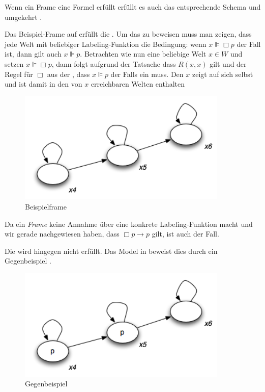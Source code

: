 Wenn ein Frame eine Formel erfüllt erfüllt es auch das entsprechende Schema und umgekehrt .

\begin{example}
	Das Beispiel-Frame auf  erfüllt die \TFormel.
	Um das zu beweisen muss man zeigen, dass jede Welt mit beliebiger Labeling-Funktion die Bedingung: wenn $x \VDash \Box p$ der Fall ist, dann gilt auch $x \VDash p$.
	Betrachten wie nun eine beliebige Welt $x \in W$ und setzen $x \VDash \Box p$, dann folgt aufgrund der Tatsache dass $R(x,x)$ gilt und der Regel für $\Box$ aus der , dass $x \VDash p$ der Falls ein muss.
	Den $x$ zeigt auf sich selbst und ist damit in den von $x$ erreichbaren Welten enthalten

	\begin{figure}[h!]
		\label{fig:Kripke02}
		\centering
		\includegraphics[width=10cm]{Images/Kripke02}
		\caption{Beispielframe}
	\end{figure}

	Da ein \emph{Frame} keine Annahme über eine konkrete Labeling-Funktion macht und wir gerade nachgewiesen haben, dass $\Box p \rightarrow p$ gilt, ist auch \TFormel der Fall.
	
	Die \vierFormel wird hingegen nicht erfüllt.
	Das Model in  beweist dies durch ein Gegenbeispiel
	.

	\begin{figure}[h!]
		\label{fig:Kripke03}
		\centering
		\includegraphics[width=10cm]{Images/Kripke03}
		\caption{Gegenbeispiel}
	\end{figure}

\end{example}

